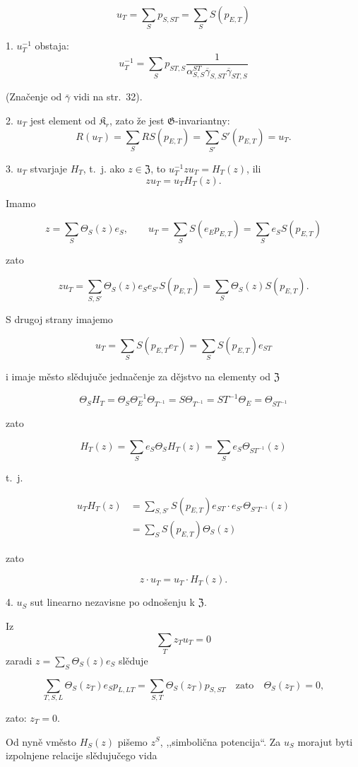 \documentclass[11pt]{article}
\begin{document}
\[
u_T=\sum_S p_{S,ST}=\sum_S S(p_{E,T})
\]



1. \(u_T^{-1}\) obstaja:
\[
u_T^{-1}=\sum_S p_{ST,S}
\frac{1}{\alpha_{S,S}^{ST}\overline{\gamma}_{S,ST}\overline{\gamma}_{ST,S}}
\]

(Značenje od \(\bar{\gamma}\) vidi na str.~32).

2. \(u_T\) jest element od \(\mathfrak K_r\), zato že jest \(\mathfrak G\)-invariantny:
\[
R(u_T)=\sum_S RS(p_{E,T})=\sum_{S'} S'(p_{E,T})=u_T.
\]

3. \(u_T\) stvarjaje \(H_T\), t.~j. ako \(z\in\mathfrak Z\), to \(u_T^{-1}zu_T=H_T(z)\), ili
\[
z u_T=u_T H_T(z).
\]

Imamo

\[
z=\sum_S\Theta_S(z)e_S,\qquad
u_T=\sum_S S(e_Ep_{E,T})=\sum_S e_S S(p_{E,T})
\]

zato

\[
zu_T=\sum_{S,S'}\Theta_S(z)e_Se_{S'}S(p_{E,T})
=\sum_S\Theta_S(z)S(p_{E,T}).
\]

S drugoj strany imajemo

\[
u_T=\sum_S S(p_{E,T}e_T)=\sum_S S(p_{E,T})e_{ST}
\]

i imaje město slědujuče jednačenje za dějstvo na elementy od \(\mathfrak Z\)

\[
\Theta_S H_T=\Theta_S\Theta_E^{-1}\Theta_{T^{-1}}
=S\Theta_{T^{-1}}=ST^{-1}\Theta_E=\Theta_{ST^{-1}}
\]

zato

\[
H_T(z)=\sum_S e_S\Theta_S H_T(z)=\sum_S e_S\Theta_{ST^{-1}}(z)
\]

t.~j.

\[
\begin{aligned}
u_TH_T(z)
&=\sum_{S,S'} S(p_{E,T})e_{ST}\cdot e_{S'}\Theta_{S'T^{-1}}(z)\\
&=\sum_S S(p_{E,T})\Theta_S(z)
\end{aligned}
\]

zato

\[
z\cdot u_T=u_T\cdot H_T(z).
\]

4. \(u_S\) sut linearno nezavisne po odnošenju k \(\mathfrak Z\).

Iz
\[
\sum_T z_Tu_T=0
\]
zaradi \(z=\sum_S\Theta_S(z)e_S\) slěduje

\[
\sum_{T,S,L}\Theta_S(z_T)e_Sp_{L,LT}
=\sum_{S,T}\Theta_S(z_T)p_{S,ST}\quad\text{zato}\quad
\Theta_S(z_T)=0,
\]

zato: \(z_T=0\).

Od nyně vměsto \(H_S(z)\) pišemo \(z^S\), ,,simbolična potencija``. Za \(u_S\) morajut byti izpolnjene relacije slědujučego vida
\end{document}
